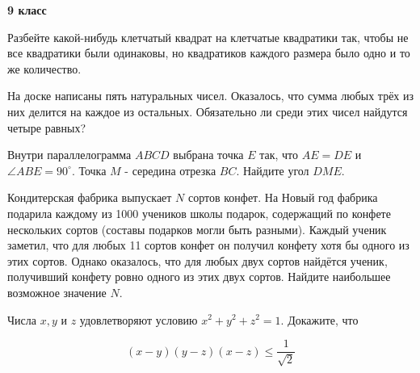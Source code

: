 \centerline{\bf \Huge 9 класс}

Разбейте какой-нибудь клетчатый квадрат на клетчатые квадратики так, чтобы не все квадратики были одинаковы, но квадратиков каждого размера было одно и то же количество.

На доске написаны пять натуральных чисел. Оказалось, что сумма любых трёх из них делится на каждое из остальных. Обязательно ли среди этих чисел найдутся четыре равных?

Внутри параллелограмма $A B C D$ выбрана точка $E$ так, что $A E=D E$ и $\angle A B E=90^{\circ}$. Точка $M$ - середина отрезка $B C$. Найдите угол $D M E$.

Кондитерская фабрика выпускает $N$ сортов конфет. На Новый год фабрика подарила каждому из 1000 учеников школы подарок, содержащий по конфете нескольких сортов (составы подарков могли быть разными). Каждый ученик заметил, что для любых 11 сортов конфет он получил конфету хотя бы одного из этих сортов. Однако оказалось, что для любых двух сортов найдётся ученик, получивший конфету ровно одного из этих двух сортов. Найдите наибольшее возможное значение $N$.

Числа $x, y$ и $z$ удовлетворяют условию $x^2+y^2+z^2=1$. Докажите, что

$$
(x-y)(y-z)(x-z) \leqslant \frac{1}{\sqrt{2}}
$$